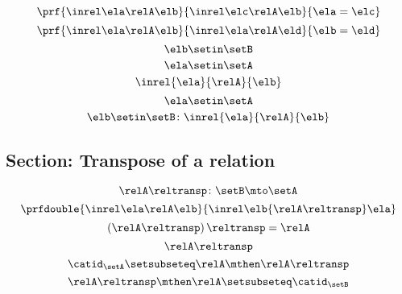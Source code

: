 \begin{forslides}
    \begin{equation}
        \label{eq:slides_session2_rel_126}
        \prf{
            \inrel \ela \relA \elb
        }{
            \inrel \elc \relA \elb
        }{
            \ela=\elc
        }
    \end{equation}
    \begin{equation}
        \label{eq:slides_session2_rel_127}
        \prf{
            \inrel \ela \relA \elb
        }{
            \inrel \ela \relA \eld
        }{
            \elb = \eld
        }
    \end{equation}
    \begin{equation}
        \label{eq:slides_session2_rel_128}
        \elb\setin \setB
    \end{equation}
    \begin{equation}
        \label{eq:slides_session2_rel_129}
        \ela\setin \setA
    \end{equation}
    \begin{equation}
        \label{eq:slides_session2_rel_130}
        \inrel{\ela}{\relA}{\elb}
    \end{equation}
    \begin{equation}
        \label{eq:slides_session2_rel_131}
        \ela\setin \setA
    \end{equation}
    \begin{equation}
        \label{eq:slides_session2_rel_132}
        \elb \setin \setB\colon \inrel{\ela}{\relA}{\elb}
    \end{equation}

    \subsection{Section: Transpose of a relation}

    \begin{equation}
        \label{eq:slides_session2_rel_133}
        \relA\reltransp\colon \setB \mto \setA
    \end{equation}
    \begin{equation}
        \label{eq:slides_session2_rel_134}
        \prfdouble{
            \inrel \ela \relA \elb
        }{
            \inrel \elb {\relA\reltransp} \ela
        }
    \end{equation}
    \begin{equation}
        \label{eq:slides_session2_rel_135}
        \left(\relA\reltransp\right)\reltransp = \relA
    \end{equation}
    \begin{equation}
        \label{eq:slides_session2_rel_136}
        \relA\reltransp
    \end{equation}
    \begin{equation}
        \label{eq:slides_session2_rel_137}
        \catid_\setA\setsubseteq \relA \mthen \relA\reltransp
    \end{equation}
    \begin{equation}
        \label{eq:slides_session2_rel_138}
        \relA\reltransp\mthen \relA\setsubseteq \catid_\setB
    \end{equation}


\end{forslides}
